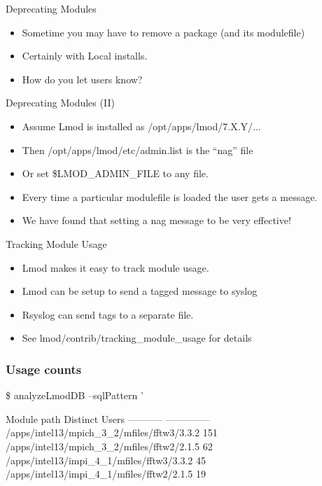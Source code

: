 \documentclass{beamer}
\begin{document}
\begin{frame}{Deprecating Modules}
  \begin{itemize}
    \item Sometime you may have to remove a package (and its
      modulefile)
    \item Certainly with Local installs.
    \item How do you let users know?
  \end{itemize}
\end{frame}

\begin{frame}{Deprecating Modules (II)}
  \begin{itemize}
    \item Assume Lmod is installed as /opt/apps/lmod/7.X.Y/...
    \item Then /opt/apps/lmod/etc/admin.list is the ``nag'' file
    \item Or set \$LMOD\_ADMIN\_FILE to any file.
    \item Every time a particular modulefile is loaded the user gets a
      message.
    \item We have found that setting a nag message to be very effective!
  \end{itemize}
\end{frame}

\begin{frame}{Tracking Module Usage}
  \begin{itemize}
    \item Lmod makes it easy to track module usage.
    \item Lmod can be setup to send a tagged message to syslog
    \item Rsyslog can send tags to a separate file.
    \item See lmod/contrib/tracking\_module\_usage for details
  \end{itemize}
\end{frame}

\begin{frame}[fragile]
    \frametitle{Usage counts}
  {\tiny
    \begin{semiverbatim}
\$ analyzeLmodDB --sqlPattern '%

  Module path                                Distinct Users
  -----------                                --------------  
  /apps/intel13/mpich\_3\_2/mfiles/fftw3/3.3.2             151
  /apps/intel13/mpich\_3\_2/mfiles/fftw2/2.1.5              62
  /apps/intel13/impi\_4\_1/mfiles/fftw3/3.3.2               45
  /apps/intel13/impi\_4\_1/mfiles/fftw2/2.1.5               19

    \end{semiverbatim}
}
\end{frame}
\end{document}
